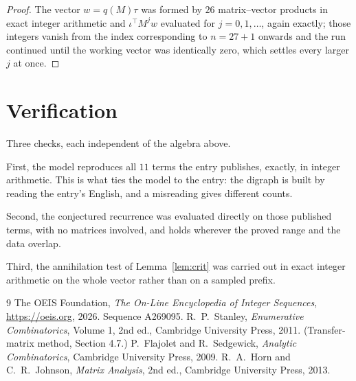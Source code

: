 \documentclass[11pt,a4paper]{article}
\theoremstyle{plain}
\theoremstyle{definition}
\begin{document}
\begin{proof}
The vector $w=q(M)\tau$ was formed by $26$ matrix--vector products in exact integer
arithmetic and $\iota^{\!\top}M^{j}w$ evaluated for $j=0,1,\dots$, again exactly; those
integers vanish from the index corresponding to $n=27+1$ onwards and the run continued
until the working vector was identically zero, which settles every larger $j$ at once.
\end{proof}

\section{Verification}

Three checks, each independent of the algebra above.

First, the model reproduces all $11$ terms the entry publishes, exactly, in integer
arithmetic. This is what ties the model to the entry: the digraph is built by reading the
entry's English, and a misreading gives different counts.

Second, the conjectured recurrence was evaluated directly on those published terms, with no
matrices involved, and holds wherever the proved range and the data overlap.

Third, the annihilation test of Lemma~\ref{lem:crit} was carried out in exact integer
arithmetic on the whole vector rather than on a sampled prefix.

\begin{thebibliography}{9}
 The OEIS Foundation, \emph{The On-Line Encyclopedia of Integer
Sequences}, \url{https://oeis.org}, 2026. Sequence A269095.
 R.~P.~Stanley, \emph{Enumerative Combinatorics}, Volume 1, 2nd ed.,
Cambridge University Press, 2011. (Transfer-matrix method, Section 4.7.)
 P.~Flajolet and R.~Sedgewick, \emph{Analytic Combinatorics}, Cambridge
University Press, 2009.
 R.~A.~Horn and C.~R.~Johnson, \emph{Matrix Analysis}, 2nd ed., Cambridge
University Press, 2013.
\end{thebibliography}
\end{document}
